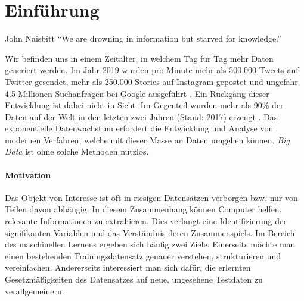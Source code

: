 \chapter{Einführung}

\label{introduction}

\begin{chapquote}{John Naisbitt}
``We are drowning in information but starved for knowledge.''
\end{chapquote}

Wir befinden uns in einem Zeitalter, in welchem Tag für Tag mehr Daten generiert werden. Im Jahr 2019 wurden pro Minute mehr als 500,000 Tweets auf Twitter gesendet, mehr als 250,000 Stories auf Instagram gepostet und ungefähr 4.5 Millionen Suchanfragen bei Google ausgeführt \cite{domo}. Ein Rückgang dieser Entwicklung ist dabei nicht in Sicht. Im Gegenteil wurden mehr als 90\% der Daten auf der Welt in den letzten zwei Jahren (Stand: 2017) erzeugt \cite{ibm}. Das exponentielle Datenwachstum erfordert die Entwicklung und Analyse von modernen Verfahren, welche mit dieser Masse an Daten umgehen können. \textit{Big Data} ist ohne solche Methoden nutzlos.
 
 


\subsubsection{Motivation}

Das Objekt von Interesse ist oft in riesigen Datensätzen verborgen bzw. nur von Teilen davon abhängig. In diesem Zusammenhang können Computer helfen, relevante Informationen zu extrahieren. Dies verlangt eine Identifizierung der signifikanten Variablen und das Verständnis deren Zusammenspiels. Im Bereich des maschinellen Lernens ergeben sich häufig zwei Ziele. Einerseits möchte man einen bestehenden Trainingsdatensatz genauer verstehen, strukturieren und vereinfachen. Andererseits interessiert man sich dafür, die erlernten Gesetzmäßigkeiten des Datensatzes auf neue, ungesehene Testdaten zu verallgemeinern. 

